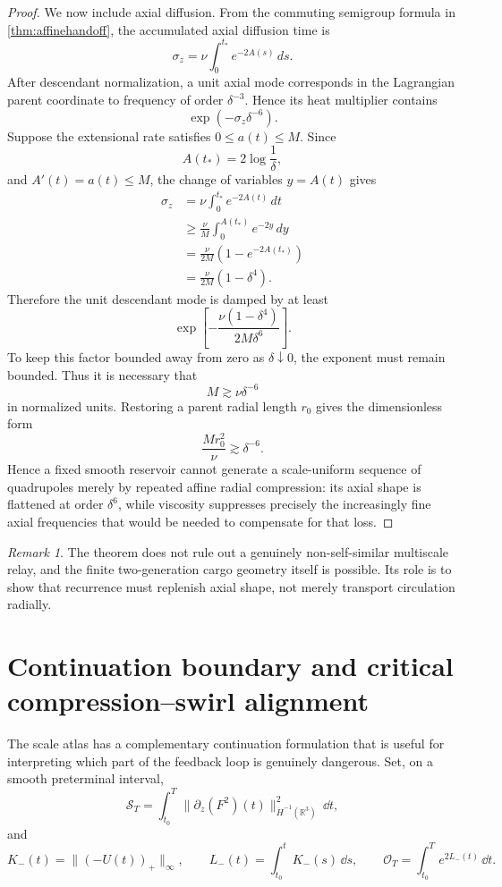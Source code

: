 \documentclass[11pt]{article}
\theoremstyle{definition}\newtheorem{definition}[theorem]{Definition}
\theoremstyle{remark}\newtheorem{remark}[theorem]{Remark}
\begin{document}
\begin{proof}
We now include axial diffusion.  From the commuting semigroup formula in \cref{thm:affinehandoff}, the accumulated axial diffusion time is
\[
 \sigma_z
 =\nu\int_0^{t_*}e^{-2A(s)}\,ds.
\]
After descendant normalization, a unit axial mode corresponds in the Lagrangian parent coordinate to frequency of order $\delta^{-3}$.  Hence its heat multiplier contains
\[
 \exp\!\left(-\sigma_z\delta^{-6}\right).
\]
Suppose the extensional rate satisfies $0\le a(t)\le M$.  Since
\[
 A(t_*)=2\log\frac1\delta,
\]
and $A'(t)=a(t)\le M$, the change of variables $y=A(t)$ gives
\[
 \begin{aligned}
 \sigma_z
 &=\nu\int_0^{t_*}e^{-2A(t)}\,dt\\
 &\ge \frac{\nu}{M}\int_0^{A(t_*)}e^{-2y}\,dy\\
 &=\frac{\nu}{2M}(1-e^{-2A(t_*)})\\
 &=\frac{\nu}{2M}(1-\delta^4).
 \end{aligned}
\]
Therefore the unit descendant mode is damped by at least
\[
 \exp\!\left[-\frac{\nu(1-\delta^4)}{2M\delta^6}\right].
\]
To keep this factor bounded away from zero as $\delta\downarrow0$, the exponent must remain bounded.  Thus it is necessary that
\[
 M\gtrsim \nu\delta^{-6}
\]
in normalized units.  Restoring a parent radial length $r_0$ gives the dimensionless form
\[
 \frac{Mr_0^2}{\nu}\gtrsim\delta^{-6}.
\]
Hence a fixed smooth reservoir cannot generate a scale-uniform sequence of quadrupoles merely by repeated affine radial compression: its axial shape is flattened at order $\delta^6$, while viscosity suppresses precisely the increasingly fine axial frequencies that would be needed to compensate for that loss.
\end{proof}

\begin{remark}
The theorem does not rule out a genuinely non-self-similar multiscale relay,
and the finite two-generation cargo geometry itself is possible.  Its role is
to show that recurrence must replenish axial shape, not merely transport
circulation radially.
\end{remark}


\section{Continuation boundary and critical compression--swirl alignment}
\label{sec:alignment}

The scale atlas has a complementary continuation formulation that is useful
for interpreting which part of the feedback loop is genuinely dangerous.
Set, on a smooth preterminal interval,
\[
\mathcal S_T
=
\int_{t_0}^T
\|\partial_z(F^2)(t)\|_{\dot H^{-1}(\mathbb R^3)}^2\,\dd t,
\]
and
\[
K_-(t)=\|(-U(t))_+\|_\infty,\qquad
L_-(t)=\int_{t_0}^tK_-(s)\,\dd s,\qquad
\mathcal O_T=\int_{t_0}^T e^{2L_-(t)}\,\dd t.
\]
\end{document}
